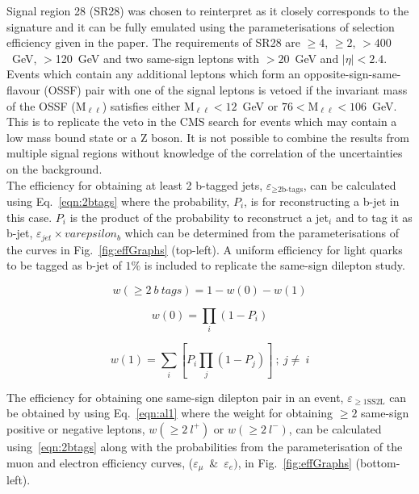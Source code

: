 Signal region 28 (SR28) was chosen to reinterpret as it closely corresponds to the \tttt signature and it can be fully emulated using the parameterisations of selection efficiency given in the paper. 
The requirements of SR28 are \njets$\geq4$, \nbtags$\geq2$, \HT$>400$~GeV, \MET$>$120~GeV and two same-sign leptons with \pt$>20$~GeV and $|\eta|<2.4$. Events which contain any additional leptons which form an opposite-sign-same-flavour (OSSF) pair with one of the signal leptons is vetoed if the invariant mass of the OSSF (M$_{\ell\ell}$) satisfies either M$_{\ell\ell}<12$~GeV or $76<$M$_{\ell\ell}<106$~GeV. This is to replicate the veto in the CMS search for events which may contain a low mass bound state or a Z boson.
It is not possible to combine the results from multiple signal regions without knowledge of the correlation of the uncertainties on the background. \\
The efficiency for obtaining at least 2 b-tagged jets, $\varepsilon_{\geq\text{2b-tags}}$, can be calculated using Eq.~\ref{eqn:2btags} where the probability, $P_{i}$, is for reconstructing a b-jet in this case. $P_{i}$ is the product of the probability to reconstruct a jet$_{i}$ and to tag it as b-jet, $\varepsilon_{jet} \times varepsilon_{b}$ which can be determined from the parameterisations of the curves in Fig.~\ref{fig:effGraphs} (top-left). A uniform efficiency for light quarks to be tagged as b-jet of $1\%$ is included to replicate the same-sign dilepton study.


\begin{equation}
w(\geq2~b~tags) = 1 - w(0) - w(1)
\label{eqn:2btags}
\end{equation}

\begin{equation}
w(0) = \prod_{i} ( 1 - P_{i})
\label{eqn:0btags}
\end{equation}


\begin{equation}
w(1) = \sum_{i}\left[P_{i}\prod_{j} ( 1 - P_{j})\right]~;~j\neq~i
\label{eqn:1btags}
\end{equation}

The efficiency for obtaining one same-sign dilepton pair in an event, $\varepsilon_{\geq1 \text{SS2L}}$ can be obtained by using Eq.~\ref{eqn:al1} where the weight for obtaining $\geq2$ same-sign positive or negative leptons, $ w(\geq2~l^{+})$ or  $ w(\geq2~l^{-})$, can be calculated using~\ref{eqn:2btags} along with the probabilities from the parameterisation of the muon and electron efficiency curves, ($\varepsilon_{\mu}$~\&~$\varepsilon_{e})$, in Fig.~\ref{fig:effGraphs} (bottom-left).

